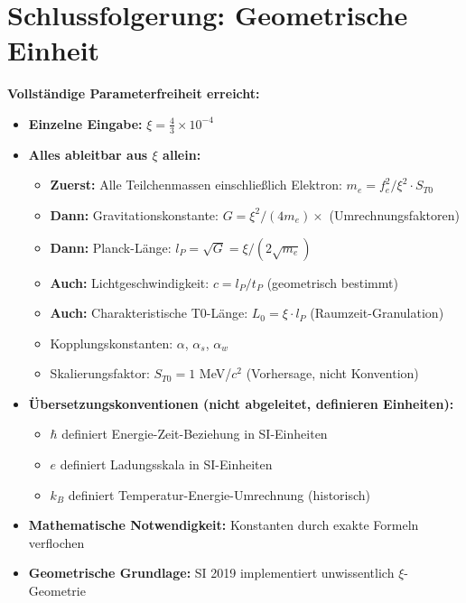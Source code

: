 \documentclass[12pt,a4paper]{article}
\begin{document}
\section{Schlussfolgerung: Geometrische Einheit}

\begin{keyresult}
\textbf{Vollst{\"a}ndige Parameterfreiheit erreicht:}
\begin{itemize}
\item \textbf{Einzelne Eingabe:} $\xi = \frac{4}{3} \times 10^{-4}$

\item \textbf{Alles ableitbar aus $\xi$ allein:}
\begin{itemize}
\item \textbf{Zuerst:} Alle Teilchenmassen einschlie{\ss}lich Elektron: $m_e = f_e^2/\xi^2 \cdot S_{T0}$
\item \textbf{Dann:} Gravitationskonstante: $G = \xi^2/(4m_e) \times$ (Umrechnungsfaktoren)
\item \textbf{Dann:} Planck-L{\"a}nge: $l_P = \sqrt{G} = \xi/(2\sqrt{m_e})$
\item \textbf{Auch:} Lichtgeschwindigkeit: $c = l_P/t_P$ (geometrisch bestimmt)
\item \textbf{Auch:} Charakteristische T0-L{\"a}nge: $L_0 = \xi \cdot l_P$ (Raumzeit-Granulation)
\item Kopplungskonstanten: $\alpha$, $\alpha_s$, $\alpha_w$
\item Skalierungsfaktor: $S_{T0} = 1$ MeV/$c^2$ (Vorhersage, nicht Konvention)
\end{itemize}

\item \textbf{{\"U}bersetzungskonventionen (nicht abgeleitet, definieren Einheiten):}
\begin{itemize}
\item $\hbar$ definiert Energie-Zeit-Beziehung in SI-Einheiten
\item $e$ definiert Ladungsskala in SI-Einheiten
\item $k_B$ definiert Temperatur-Energie-Umrechnung (historisch)
\end{itemize}

\item \textbf{Mathematische Notwendigkeit:} Konstanten durch exakte Formeln verflochen

\item \textbf{Geometrische Grundlage:} SI 2019 implementiert unwissentlich $\xi$-Geometrie
\end{itemize}
\end{keyresult}
\end{document}
